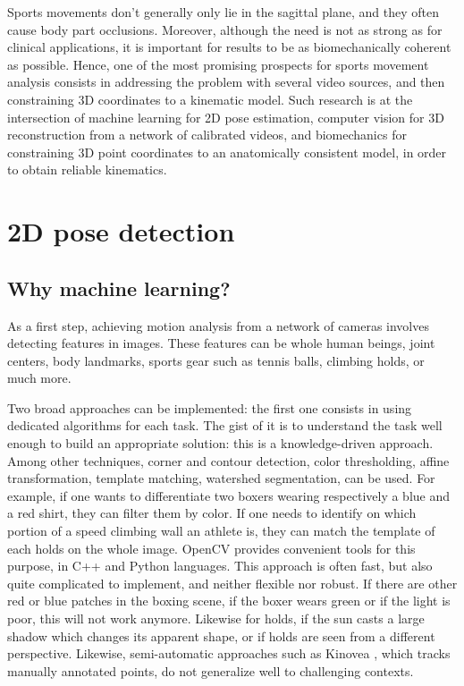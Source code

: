 Sports movements don’t generally only lie in the sagittal plane, and they often cause body part occlusions. Moreover, although the need is not as strong as for clinical applications, it is important for results to be as biomechanically coherent as possible. Hence, one of the most promising prospects for sports movement analysis consists in addressing the problem with several video sources, and then constraining 3D coordinates to a kinematic model.  Such research is at the intersection of machine learning for 2D pose estimation, computer vision for 3D reconstruction from a network of calibrated videos, and biomechanics for constraining 3D point coordinates to an anatomically consistent model, in order to obtain reliable kinematics. 


\section{2D pose detection}

\subsection{Why machine learning?}

As a first step, achieving motion analysis from a network of cameras involves detecting features in images. These features can be whole human beings, joint centers, body landmarks, sports gear such as tennis balls, climbing holds, or much more. 

Two broad approaches can be implemented: the first one consists in using dedicated algorithms for each task. The gist of it is to understand the task well enough to build an appropriate solution: this is a knowledge-driven approach. Among other techniques, corner and contour detection, color thresholding, affine transformation, template matching, watershed segmentation, can be used. For example, if one wants to differentiate two boxers wearing respectively a blue and a red shirt, they can filter them by color. If one needs to identify on which portion of a speed climbing wall an athlete is, they can match the template of each holds on the whole image. OpenCV \cite{Bradski2000} provides convenient tools for this purpose, in C++ and Python languages. This approach is often fast, but also quite complicated to implement, and neither flexible nor robust. If there are other red or blue patches in the boxing scene, if the boxer wears green or if the light is poor, this will not work anymore. Likewise for holds, if the sun casts a large shadow which changes its apparent shape, or if holds are seen from a different perspective. Likewise, semi-automatic approaches such as Kinovea \cite{Kinovea}, which tracks manually annotated points, do not generalize well to challenging contexts.


